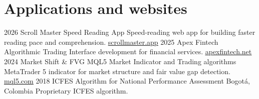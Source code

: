 \documentclass[]{friggeri-cv}
\let\OrigHref\href
\renewcommand{\href}[2]{\OrigHref{#1}{\bodyfont\color{blue}\uline{#2}}}
\begin{document}
\section{Applications and websites}
\begin{entrylist}
\entry
    {2026}
    {Scroll Master}
    {Speed Reading App}
    {Speed-reading web app for building faster reading pace and comprehension. \href{https://scrollmaster.app/}{scrollmaster.app}}
  \entry
    {2025}
    {Apex Fintech}
    {Algorithmic Trading}
    {Interface development for financial services. \href{https://apexfintech.net/}{apexfintech.net}}
  \entry
    {2024}
    {Market Shift \& FVG}
    {MQL5 Market Indicator and Trading algorithms}
    {MetaTrader 5 indicator for market structure and fair value gap detection. \href{https://www.mql5.com/en/market/product/131053}{mql5.com}}
  \entry
    {2018}
    {ICFES Algorithm for National Performance Assessment}
    {Bogotá, Colombia}
    {Proprietary ICFES algorithm.}
\end{entrylist}
\end{document}
